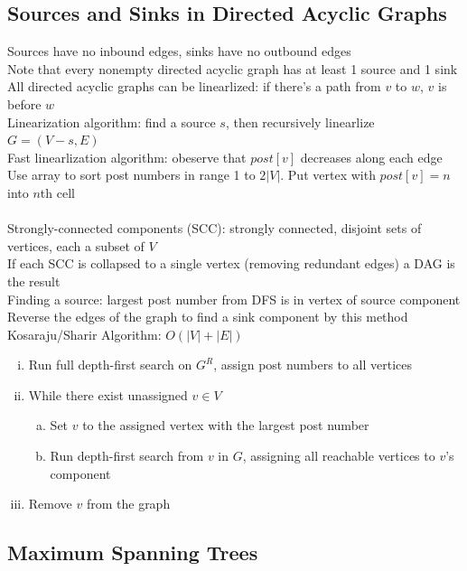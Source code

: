 \documentclass{article}
\begin{document}
		\subsection{Sources and Sinks in Directed Acyclic Graphs}
			Sources have no inbound edges, sinks have no outbound edges \\
			Note that every nonempty directed acyclic graph has at least 1 source and 1 sink \\
			All directed acyclic graphs can be linearlized: if there's a path from $v$ to $w$, $v$ is before $w$ \\
			Linearization algorithm: find a source $s$, then recursively linearlize $G = (V - s, E)$ \\
			Fast linearlization algorithm: obeserve that $post[v]$ decreases along each edge \\
			Use array to sort post numbers in range 1 to $2|V|$. Put vertex with $post[v] = n$ into $n$th cell \\
			\\
			Strongly-connected components (SCC): strongly connected, disjoint sets of vertices, each a subset of $V$ \\
			If each SCC is collapsed to a single vertex (removing redundant edges) a DAG is the result \\
			Finding a source: largest post number from DFS is in vertex of source component \\
			Reverse the edges of the graph to find a sink component by this method \\
			Kosaraju/Sharir Algorithm: $O(|V| + |E|)$
			\begin{enumerate}[(i)]
				\item Run full depth-first search on $G^R$, assign post numbers to all vertices
				\item While there exist unassigned $v \in V$
				\begin{enumerate}[(a)]
					\item Set $v$ to the assigned vertex with the largest post number
					\item Run depth-first search from $v$ in $G$, assigning all reachable vertices to $v$'s component
					\end{enumerate}
					\item Remove $v$ from the graph
				\end{enumerate}
		\subsection{Maximum Spanning Trees}
\end{document}
